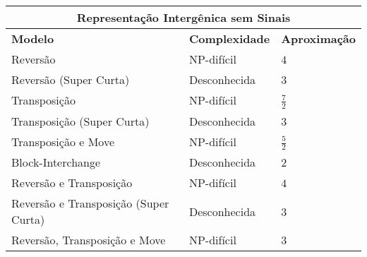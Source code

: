 \begin{table}[!htb]
  \begin{tabular}{|p{8cm}|p{3cm}|p{3cm}|}
    \hline
    \multicolumn{3}{|c|}{{\bf Representação Intergênica sem Sinais}}                                                                             \\ \hline
    {\bf Modelo}                            & {\bf Complexidade}                                 & {\bf Aproximação}                             \\ \hline
    Reversão                                & NP-difícil~\cite{2020a-brito-etal}           & $4$~\cite{2020a-brito-etal}                         \\ \hline
    Reversão (Super Curta)                  & Desconhecida                                 & $3$~\cite{2019c-oliveira-etal}                      \\ \hline
    Transposição                            & NP-difícil~\cite{2021a-oliveira-etal}        & $\frac{7}{2}$~\cite{2021a-oliveira-etal}            \\ \hline
    Transposição (Super Curta)              & Desconhecida                                 & $3$~\cite{2019c-oliveira-etal}                      \\ \hline
    Transposição e Move                     & NP-difícil~\cite{2021a-oliveira-etal}        & $\frac{5}{2}$~\cite{2021a-oliveira-etal}            \\ \hline
    Block-Interchange                       & Desconhecida                                 & $2$~\cite{2019-dias-etal}                           \\ \hline
    Reversão e Transposição                 & NP-difícil~\cite{2020a-brito-etal}           & $4$~\cite{2021b-brito-etal}                         \\ \hline
    Reversão e Transposição (Super Curta)   & Desconhecida                                 & $3$~\cite{2019c-oliveira-etal}                      \\ \hline
    Reversão, Transposição e Move           & NP-difícil~\cite{2021b-brito-etal}           & $3$~\cite{2021b-brito-etal}                         \\ \hline
  \end{tabular}
\end{table}